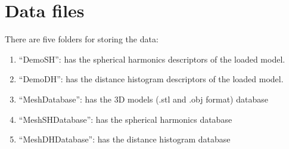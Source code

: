 \section{Data files}

There are five folders for storing the data:

\begin{enumerate}[1.]
\item ``DemoSH'': has the spherical harmonics descriptors of the loaded model. 
\item ``DemoDH'': has the distance histogram descriptors of the loaded model.
\item ``MeshDatabase'': has the 3D models (.stl and .obj format) database 
\item ``MeshSHDatabase'': has the spherical harmonics database
\item ``MeshDHDatabase'': has the distance histogram database
\end{enumerate}
